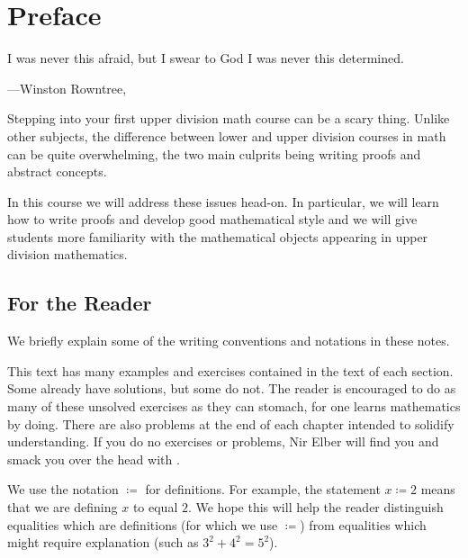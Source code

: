 \documentclass[../notes.tex]{subfiles}
\begin{document}
\chapter{Preface} %
\epigraph{I was never this afraid, but I swear to God I was never this determined.}
{---Winston Rowntree, \cite{people-watching-nostalgia}}

Stepping into your first upper division math course can be a scary thing.
Unlike other subjects, the difference between lower and upper division courses in math can be quite overwhelming, the two main culprits being writing proofs and abstract concepts.

In this course we will address these issues head-on. In particular, we will learn how to write proofs and develop good mathematical style and we will give students more familiarity with the mathematical objects appearing in upper division mathematics.

\section{For the Reader}
We briefly explain some of the writing conventions and notations in these notes.

This text has many examples and exercises contained in the text of each section. Some already have solutions, but some do not. The reader is encouraged to do as many of these unsolved exercises as they can stomach, for one learns mathematics by doing. There are also problems at the end of each chapter intended to solidify understanding. If you do no exercises or problems, Nir Elber will find you and smack you over the head with \cite{rosen}.

We use the notation $\coloneqq$ for definitions. For example, the statement $x\coloneqq2$ means that we are defining $x$ to equal $2$. We hope this will help the reader distinguish equalities which are definitions (for which we use $\coloneqq$) from equalities which might require explanation (such as $3^2+4^2=5^2$).
\end{document}
